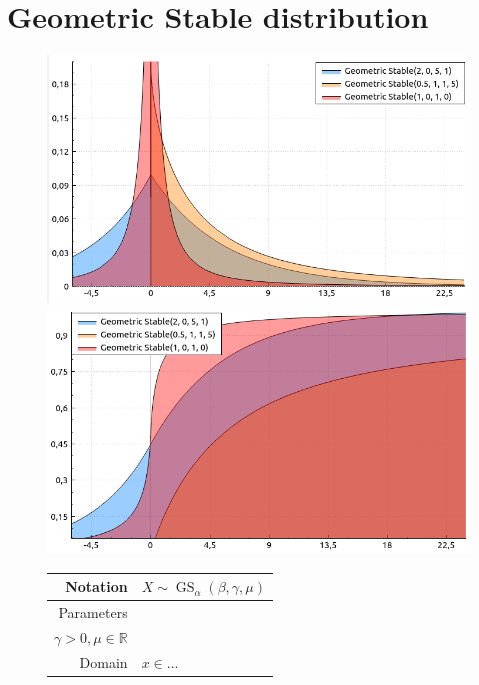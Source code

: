 \documentclass[a4paper,11pt]{article}
\theoremstyle{plain}
\theoremstyle{definition}
\newcommand{\MR}{\mathbb{R}}
\begin{document}
	\section{Geometric Stable distribution}
	\begin{figure}[!htb]\centering
		\begin{minipage}{0.55\textwidth}
			\includegraphics[width=\linewidth, right]{geometric_stable_pdf}
			\captionsetup{labelformat=empty}
			\includegraphics[width=\linewidth, right]{geometric_stable_cdf}
			\captionsetup{labelformat=empty}
		\end{minipage}
		\begin{minipage}{0.4\textwidth}
			\begin{tabular}{| r | l |}
				\hline
				Notation & $X \sim \operatorname{GS}_\alpha(\beta, \gamma, \mu)$ \\
				\hline
				Parameters & \pbox{\linewidth}{$\alpha \in (0, 2], \beta \in [-1, 1],$\\ $\gamma > 0, \mu \in \MR $} \\
				\hline
				Domain & $x \in ...$  \\

\end{tabular}
\end{minipage}
\end{figure}
\end{document}

